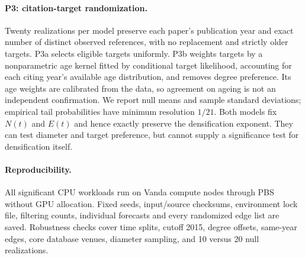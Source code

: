 \paragraph{P3: citation-target randomization.}
Twenty realizations per model preserve each paper's publication year and exact
number of distinct observed references, with no replacement and strictly older
targets. P3a selects eligible targets uniformly. P3b weights targets by a nonparametric age kernel fitted by conditional
target likelihood, accounting for each citing year's available age distribution,
and removes degree preference.
Its age weights are calibrated from the data, so agreement on ageing is not an
independent confirmation. We report null means and sample standard deviations;
empirical tail probabilities have minimum resolution $1/21$.
Both models fix $N(t)$ and $E(t)$ and hence exactly preserve the densification
exponent. They can test diameter and target preference, but cannot supply a
significance test for densification itself.

\paragraph{Reproducibility.}
All significant CPU workloads run on Vanda compute nodes through PBS without GPU
allocation. Fixed seeds, input/source checksums, environment lock file, filtering
counts, individual forecasts and every randomized edge list are saved.
Robustness checks cover time splits, cutoff 2015, degree offsets, same-year edges,
core database venues, diameter sampling, and 10 versus 20 null realizations.
